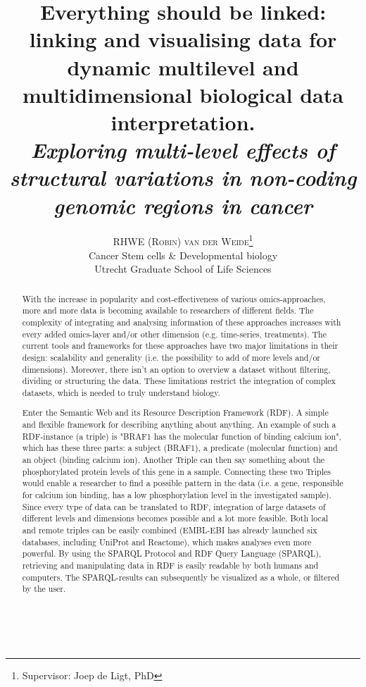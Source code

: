 \documentclass[twoside,fontsize=10pt]{article}
\title{\vspace{-15mm}\fontsize{18pt}{10pt}\normalfont\textbf{Everything should be linked: linking and visualising data for dynamic multilevel and multidimensional biological data interpretation.\\ \vspace{4 mm} {{\footnotesize \textit{Exploring multi-level effects of structural variations in non-coding genomic regions in cancer}}}}} %
\author{
\large
\textsc{RHWE (Robin) van der Weide}\thanks{Supervisor: Joep de Ligt, PhD}\\[2mm] %
\normalsize   Cancer Stem cells \& Developmental biology \\ %
\normalsize  Utrecht Graduate School of Life Sciences \\ %
\vspace{-5mm}
}
\date{}
\renewcommand{\abstractname}{}    %
\begin{document}
\maketitle %

\thispagestyle{fancy} %

\newpage
\mbox{   }
\newpage
\renewcommand{\abstractname}{\begin{center}
Summary of the research
\end{center}}    %
\begin{abstract}
\noindent With the increase in popularity and cost-effectiveness of various omics-approaches, more and more data is becoming available to researchers of different fields. The complexity of integrating and analysing information of these approaches increases with every added omics-layer and/or other dimension (e.g. time-series, treatments). The current tools and frameworks for these approaches have two major limitations in their design: scalability and generality (i.e. the possibility to add of more levels and/or dimensions). Moreover, there isn't an option to overview a dataset without filtering, dividing or structuring the data. These limitations restrict the integration of complex datasets, which is needed to truly understand biology.
\medskip

\noindent Enter the Semantic Web and its Resource Description Framework (RDF). A simple and flexible framework for describing anything about anything. An example of such a RDF-instance (a triple) is "BRAF1 has the molecular function of binding calcium ion", which has these three parts: a subject (BRAF1), a predicate (molecular function) and an object (binding calcium ion). Another Triple can then say something about the phosphorylated protein levels of this gene in a sample. Connecting these two Triples would enable a researcher to find a possible pattern in the data (i.e. a gene, responsible for calcium ion binding, has a low phosphorylation level in the investigated sample). Since every type of data can be translated to RDF, integration of large datasets of different levels and dimensions becomes possible and a lot more feasible. Both local and remote triples can be easily combined (EMBL-EBI has already launched six databases, including UniProt and Reactome), which makes analyses even more powerful. By using the SPARQL Protocol and RDF Query Language (SPARQL), retrieving and manipulating data in RDF is easily readable by both humans and computers. The SPARQL-results can subsequently be visualized as a whole, or filtered by the user. 
\medskip


\end{abstract}
\end{document}
